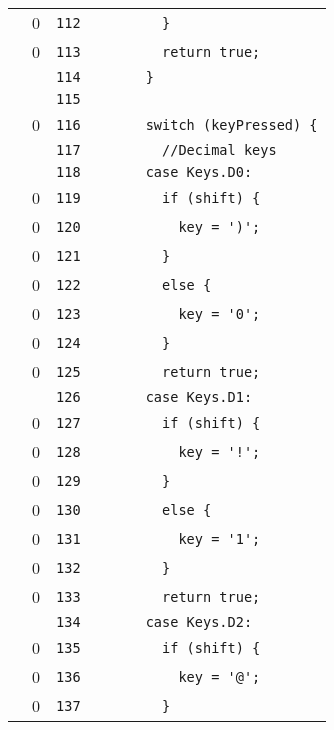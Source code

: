 \documentclass[a4paper,10pt]{article}
\begin{document}
\begin{longtable}[l]{lrrl}
\cellcolor{red} & 0 & \verb~112~ & \verb~        }~\\
\cellcolor{red} & 0 & \verb~113~ & \verb~        return true;~\\
\cellcolor{gray} &  & \verb~114~ & \verb~      }~\\
\cellcolor{gray} &  & \verb~115~ & \verb~~\\
\cellcolor{red} & 0 & \verb~116~ & \verb~      switch (keyPressed) {~\\
\cellcolor{gray} &  & \verb~117~ & \verb~        //Decimal keys~\\
\cellcolor{gray} &  & \verb~118~ & \verb~      case Keys.D0:~\\
\cellcolor{red} & 0 & \verb~119~ & \verb~        if (shift) {~\\
\cellcolor{red} & 0 & \verb~120~ & \verb~          key = ')';~\\
\cellcolor{red} & 0 & \verb~121~ & \verb~        }~\\
\cellcolor{red} & 0 & \verb~122~ & \verb~        else {~\\
\cellcolor{red} & 0 & \verb~123~ & \verb~          key = '0';~\\
\cellcolor{red} & 0 & \verb~124~ & \verb~        }~\\
\cellcolor{red} & 0 & \verb~125~ & \verb~        return true;~\\
\cellcolor{gray} &  & \verb~126~ & \verb~      case Keys.D1:~\\
\cellcolor{red} & 0 & \verb~127~ & \verb~        if (shift) {~\\
\cellcolor{red} & 0 & \verb~128~ & \verb~          key = '!';~\\
\cellcolor{red} & 0 & \verb~129~ & \verb~        }~\\
\cellcolor{red} & 0 & \verb~130~ & \verb~        else {~\\
\cellcolor{red} & 0 & \verb~131~ & \verb~          key = '1';~\\
\cellcolor{red} & 0 & \verb~132~ & \verb~        }~\\
\cellcolor{red} & 0 & \verb~133~ & \verb~        return true;~\\
\cellcolor{gray} &  & \verb~134~ & \verb~      case Keys.D2:~\\
\cellcolor{red} & 0 & \verb~135~ & \verb~        if (shift) {~\\
\cellcolor{red} & 0 & \verb~136~ & \verb~          key = '@';~\\
\cellcolor{red} & 0 & \verb~137~ & \verb~        }~\\

\end{longtable}
\end{document}
